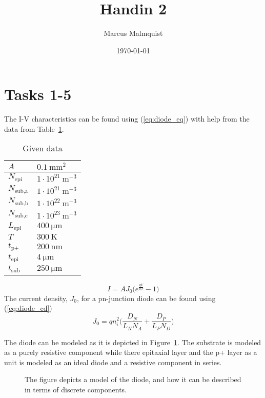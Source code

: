 \documentclass[12pt,a4paper]{article}
\title{Handin 2}
\author{Marcus Malmquist}
\date{\today}
\begin{document}
\maketitle
\section{Tasks 1-5}
The I-V characteristics can be found using (\ref{eq:diode_eq}) with help from the data from Table~\ref{tab:data}.
\begin{table}
  \centering
  \caption{Given data}
  \begin{tabular}{|l|l|} \hline
    $A$ & $\SI{0.1}{\milli\metre^2}$ \\\hline
    $N_{\text{epi}}$ & $1\cdot 10^{21}\SI{}{\metre^{-3}}$ \\\hline
    $N_{\text{sub,a}}$ & $1\cdot 10^{21}\SI{}{\metre^{-3}}$ \\\hline
    $N_{\text{sub,b}}$ & $1\cdot 10^{22}\SI{}{\metre^{-3}}$ \\\hline
    $N_{\text{sub,c}}$ & $1\cdot 10^{23}\SI{}{\metre^{-3}}$ \\\hline
    $L_{\text{epi}}$ & $\SI{400}{\micro\metre}$ \\\hline
    $T$ & $\SI{300}{\kelvin}$ \\\hline
    $t_{\text{p+}}$ & $\SI{200}{\nano\metre}$ \\\hline
    $t_{\text{epi}}$ & $\SI{4}{\micro\metre}$ \\\hline
    $t_{\text{sub}}$ & $\SI{250}{\micro\metre}$ \\\hline
  \end{tabular}
  \label{tab:data}
\end{table}
\begin{equation}
  \label{eq:diode_eq}
  I = AJ_0 \big(e^{\frac{qV}{kT}} - 1\big)
\end{equation}
The current density, $J_0$, for a pn-junction diode can be found using (\ref{eq:diode_cd})
\begin{equation}
  \label{eq:diode_cd}
  J_0 = q n^{2}_{i} \Bigg(\frac{D_N}{L_NN_A} + \frac{D_P}{L_PN_D}\Bigg)
\end{equation}

The diode can be modeled as it is depicted in Figure~\ref{fig:schematic}.
The substrate is modeled as a purely resistive component while there epitaxial layer and the p+ layer as a unit is modeled as an ideal diode and a resistive component in series.
\begin{figure}[!ht]
  \centering
  \noindent\makebox[\textwidth]{\scalebox{0.9}{}}
  \caption{The figure depicts a model of the diode, and how it can be described in terms of discrete components.}
  \label{fig:schematic}
\end{figure}
\end{document}
